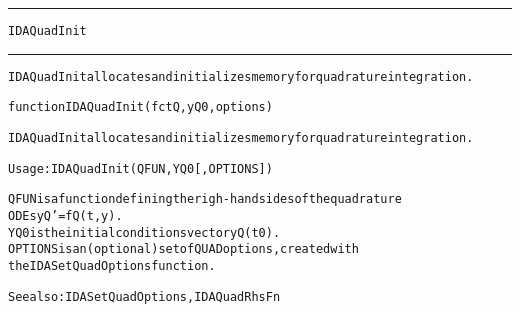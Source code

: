 \begin{samepage}
\hrule
\begin{center}
{\large \verb!IDAQuadInit!}
\label{p:IDAQuadInit}
\end{center}
\hrule\vspace{0.1in}



\begin{alltt}
IDAQuadInit allocates and initializes memory for quadrature integration.
\end{alltt}

\end{samepage}



\begin{samepage}


\begin{alltt}
function IDAQuadInit(fctQ, yQ0, options) 
\end{alltt}

\end{samepage}



\begin{alltt}
IDAQuadInit allocates and initializes memory for quadrature integration.

   Usage: IDAQuadInit ( QFUN, YQ0 [, OPTIONS ] ) 

   QFUN     is a function defining the righ-hand sides of the quadrature
            ODEs yQ' = fQ(t,y).
   YQ0      is the initial conditions vector yQ(t0).
   OPTIONS  is an (optional) set of QUAD options, created with
            the IDASetQuadOptions function. 

   See also: IDASetQuadOptions, IDAQuadRhsFn
\end{alltt}






\vspace{0.1in}